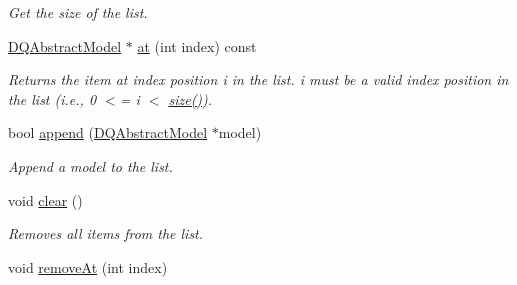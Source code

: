\begin{DoxyCompactItemize}
\begin{DoxyCompactList}\small\item\em Get the size of the list. \item\end{DoxyCompactList}\item 
\hypertarget{classDQSharedList_a5e1b99909df76c180ec4a064d28e718a}{
\hyperlink{classDQAbstractModel}{DQAbstractModel} $\ast$ \hyperlink{classDQSharedList_a5e1b99909df76c180ec4a064d28e718a}{at} (int index) const }
\label{classDQSharedList_a5e1b99909df76c180ec4a064d28e718a}

\begin{DoxyCompactList}\small\item\em Returns the item at index position i in the list. i must be a valid index position in the list (i.e., 0 $<$= i $<$ \hyperlink{classDQSharedList_a7686c471ce10b212b120ac2676d466e8}{size()}). \item\end{DoxyCompactList}\item 
bool \hyperlink{classDQSharedList_adf41e7baf9d654822ac241d7b8d8e404}{append} (\hyperlink{classDQAbstractModel}{DQAbstractModel} $\ast$model)
\begin{DoxyCompactList}\small\item\em Append a model to the list. \item\end{DoxyCompactList}\item 
\hypertarget{classDQSharedList_a80ee6896432a12ec96d069be5c9dfdbc}{
void \hyperlink{classDQSharedList_a80ee6896432a12ec96d069be5c9dfdbc}{clear} ()}
\label{classDQSharedList_a80ee6896432a12ec96d069be5c9dfdbc}

\begin{DoxyCompactList}\small\item\em Removes all items from the list. \item\end{DoxyCompactList}\item 
\hypertarget{classDQSharedList_af2dc317705579a1f7bd965f71cf32ee2}{
void \hyperlink{classDQSharedList_af2dc317705579a1f7bd965f71cf32ee2}{removeAt} (int index)}
\label{classDQSharedList_af2dc317705579a1f7bd965f71cf32ee2}


\end{DoxyCompactItemize}

